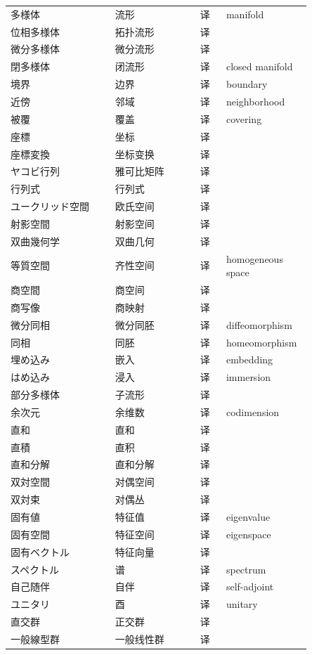 {\begin{longtable}{p{0.32\linewidth} p{0.26\linewidth} p{0.08\linewidth} p{0.19\linewidth}}
多様体 & 流形 & 译 & manifold \\
位相多様体 & 拓扑流形 & 译 &  \\
微分多様体 & 微分流形 & 译 &  \\
閉多様体 & 闭流形 & 译 & closed manifold \\
境界 & 边界 & 译 & boundary \\
近傍 & 邻域 & 译 & neighborhood \\
被覆 & 覆盖 & 译 & covering \\
座標 & 坐标 & 译 &  \\
座標変換 & 坐标变换 & 译 &  \\
ヤコビ行列 & 雅可比矩阵 & 译 &  \\
行列式 & 行列式 & 译 &  \\
ユークリッド空間 & 欧氏空间 & 译 &  \\
射影空間 & 射影空间 & 译 &  \\
双曲幾何学 & 双曲几何 & 译 &  \\
等質空間 & 齐性空间 & 译 & homogeneous space \\
商空間 & 商空间 & 译 &  \\
商写像 & 商映射 & 译 &  \\
微分同相 & 微分同胚 & 译 & diffeomorphism \\
同相 & 同胚 & 译 & homeomorphism \\
埋め込み & 嵌入 & 译 & embedding \\
はめ込み & 浸入 & 译 & immersion \\
部分多様体 & 子流形 & 译 &  \\
余次元 & 余维数 & 译 & codimension \\
直和 & 直和 & 译 &  \\
直積 & 直积 & 译 &  \\
直和分解 & 直和分解 & 译 &  \\
双対空間 & 对偶空间 & 译 &  \\
双対束 & 对偶丛 & 译 &  \\
固有値 & 特征值 & 译 & eigenvalue \\
固有空間 & 特征空间 & 译 & eigenspace \\
固有ベクトル & 特征向量 & 译 &  \\
スペクトル & 谱 & 译 & spectrum \\
自己随伴 & 自伴 & 译 & self-adjoint \\
ユニタリ & 酉 & 译 & unitary \\
直交群 & 正交群 & 译 &  \\
一般線型群 & 一般线性群 & 译 &  \\

\end{longtable}}
